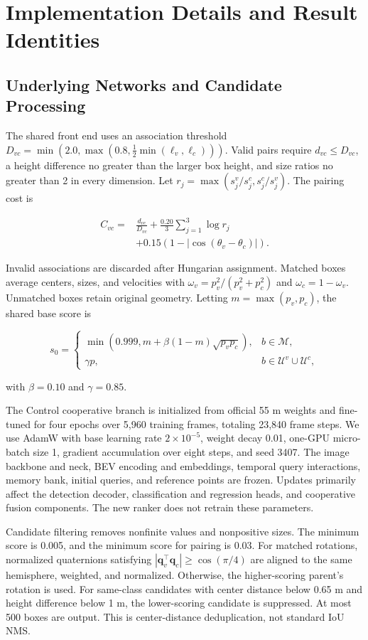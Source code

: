 \appendix
\section{Implementation Details and Result Identities}

\subsection{Underlying Networks and Candidate Processing}

The shared front end uses an association threshold $D_{vc}=\min(2.0,\max(0.8,\tfrac12\min(\ell_v,\ell_c)))$. Valid pairs require $d_{vc}\leq D_{vc}$, a height difference no greater than the larger box height, and size ratios no greater than 2 in every dimension. Let $r_j=\max(s_j^v/s_j^c,s_j^c/s_j^v)$. The pairing cost is

\[
\begin{aligned}
C_{vc}={}&\frac{d_{vc}}{D_{vc}}+\frac{0.20}{3}\sum_{j=1}^{3}\log r_j\\
&+0.15(1-|\cos(\theta_v-\theta_c)|).
\end{aligned}
\]

Invalid associations are discarded after Hungarian assignment. Matched boxes average centers, sizes, and velocities with $\omega_v=p_v^2/(p_v^2+p_c^2)$ and $\omega_c=1-\omega_v$. Unmatched boxes retain original geometry. Letting $m=\max(p_v,p_c)$, the shared base score is

\[
s_0=\begin{cases}
\min(0.999,m+\beta(1-m)\sqrt{p_vp_c}), & b\in\mathcal M,\\
\gamma p, & b\in\mathcal U^v\cup\mathcal U^c,
\end{cases}
\]

with $\beta=0.10$ and $\gamma=0.85$.

The Control cooperative branch is initialized from official 55 m weights and fine-tuned for four epochs over 5,960 training frames, totaling 23,840 frame steps. We use AdamW with base learning rate $2\times10^{-5}$, weight decay 0.01, one-GPU micro-batch size 1, gradient accumulation over eight steps, and seed 3407. The image backbone and neck, BEV encoding and embeddings, temporal query interactions, memory bank, initial queries, and reference points are frozen. Updates primarily affect the detection decoder, classification and regression heads, and cooperative fusion components. The new ranker does not retrain these parameters.

Candidate filtering removes nonfinite values and nonpositive sizes. The minimum score is 0.005, and the minimum score for pairing is 0.03. For matched rotations, normalized quaternions satisfying $|\mathbf q_v^\top\mathbf q_c|\geq\cos(\pi/4)$ are aligned to the same hemisphere, weighted, and normalized. Otherwise, the higher-scoring parent's rotation is used. For same-class candidates with center distance below 0.65 m and height difference below 1 m, the lower-scoring candidate is suppressed. At most 500 boxes are output. This is center-distance deduplication, not standard IoU NMS.

